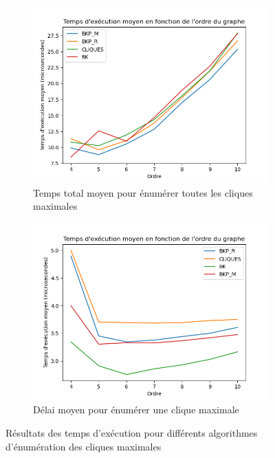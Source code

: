 \documentclass[12pt,a4paper]{article}
\begin{document}
\begin{figure}[h!]
    \centering
    \begin{subfigure}[b]{0.49\textwidth}
        \centering
        \includegraphics[width=\textwidth]{images/total_plot.png}
        \caption{Temps total moyen pour énumérer toutes les cliques maximales}
        \label{subfig:total_plot}
    \end{subfigure}
    \hfill
    \begin{subfigure}[b]{0.49\textwidth}
        \centering
        \includegraphics[width=\textwidth]{images/delay_plot.png}
        \caption{Délai moyen pour énumérer une clique maximale}
        \label{subfig:delay_plot}
    \end{subfigure}
    \caption{Résultats des temps d'exécution pour différents algorithmes d'énumération des cliques maximales}
    \label{fig:res1}
\end{figure}
\end{document}
